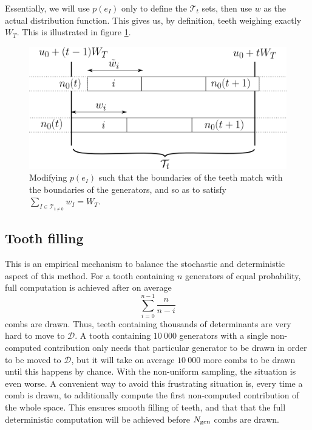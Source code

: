 \documentclass[./thesis.tex]{subfiles}
\begin{document}
Essentially, we will use $p(e_I)$ only to define the $\mathcal{T}_t$ sets, then use $w$ as the actual distribution function. This gives us, by definition, teeth weighing exactly $W_T$.
This is illustrated in figure \ref{fig:toothbuilding}.
 
\begin{figure}[h!]
	\begin{center}
		\includegraphics[width=0.9\columnwidth]{figures/pt2/toothbuilding}
	\end{center}
	\caption{Modifying $p(e_I)$ such that the boundaries of the teeth match with the boundaries of the generators, and so as to satisfy $\sum_{I \in \mathcal{T}_{t \neq 0}} w_I = W_T$.}
        \label{fig:toothbuilding}
\end{figure}





\subsection{Tooth filling}

This is an empirical mechanism to balance the stochastic and deterministic aspect of this method. For a tooth containing $n$ generators of equal probability, full computation is achieved after on average
\begin{equation}
\sum_{i=0}^{n-1} \frac{n}{n-i}
\end{equation}
combs are drawn. Thus, teeth containing thousands of determinants are very hard to move to $\mathcal{D}$. A tooth containing $10~000$ generators with a single non-computed contribution only needs that particular generator to be drawn in order to be moved to $\mathcal{D}$, but it will take on average $10~000$ more combs to be drawn until this happens by chance. With the non-uniform sampling, the situation is even worse.
A convenient way to avoid this frustrating situation is, every time a comb is drawn, to additionally compute the first non-computed contribution of the whole space. This ensures smooth filling of teeth, and that that the full deterministic computation will be achieved before ${N_\text{gen}}$ combs are drawn.
\end{document}
